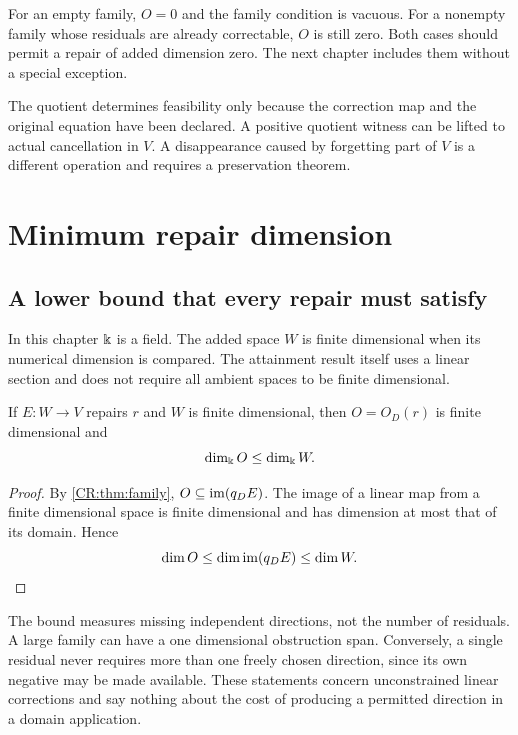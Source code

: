 For an empty family, $O=0$ and the family condition is vacuous. For a nonempty family whose residuals are already correctable, $O$ is still zero. Both cases should permit a repair of added dimension zero. The next chapter includes them without a special exception.

\begin{scopebox}[title=What has been established]
The quotient determines feasibility only because the correction map and the original equation have been declared. A positive quotient witness can be lifted to actual cancellation in $V$. A disappearance caused by forgetting part of $V$ is a different operation and requires a preservation theorem.
\end{scopebox}

\section{Minimum repair dimension}\label{CR:cr-source-section-2}\label{CR:ch:minimal}
\subsection{A lower bound that every repair must satisfy}
In this chapter $\Bbbk$ is a field. The added space $W$ is finite dimensional when its numerical dimension is compared. The attainment result itself uses a linear section and does not require all ambient spaces to be finite dimensional.

\begin{CRtheorem}\label{CR:thm:lower}
If $E:W\to V$ repairs $r$ and $W$ is finite dimensional, then $O=O_D(r)$ is finite dimensional and
\[
\dim_{\Bbbk}O\leq\dim_{\Bbbk}W.
\]
\end{CRtheorem}
\begin{proof}
By \cref{CR:thm:family}, $O\subseteq\operatorname{im}(q_DE)$. The image of a linear map from a finite dimensional space is finite dimensional and has dimension at most that of its domain. Hence
\[
\dim O\leq\dim\operatorname{im}(q_DE)\leq\dim W.\qedhere
\]
\end{proof}

The bound measures missing independent directions, not the number of residuals. A large family can have a one dimensional obstruction span. Conversely, a single residual never requires more than one freely chosen direction, since its own negative may be made available. These statements concern unconstrained linear corrections and say nothing about the cost of producing a permitted direction in a domain application.

